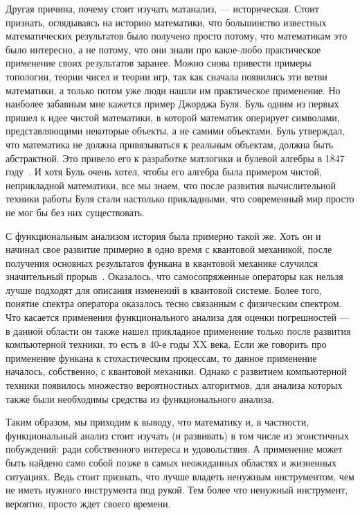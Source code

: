 \documentclass[russian]{article}
\begin{document}
Другая причина, почему стоит изучать матанализ, --- историческая. Стоит признать, оглядываясь на историю математики, что большинство известных математических результатов было получено просто потому, что математикам это было интересно, а не потому, что они знали про какое-любо практическое применение своих результатов заранее. Можно снова привести примеры топологии, теории чисел и теории игр, так как сначала появились эти ветви математики, а только потом уже люди нашли им практическое применение. Но наиболее забавным мне кажется пример Джорджа Буля. Буль одним из первых пришел к идее чистой математики, в которой математик оперирует символами, представляющими некоторые объекты, а не самими объектами. Буль утверждал, что математика не должна привязываться к реальным объектам, должна быть абстрактной. Это привело его к разработке матлогики и булевой алгебры в 1847 году~\cite{boole}. И хотя Буль очень хотел, чтобы его алгебра была примером чистой, неприкладной математики, все мы знаем, что после развития вычислительной техники работы Буля стали настолько прикладными, что современный мир просто не мог бы без них существовать.

С функциональным анализом история была примерно такой же. Хоть он и начинал свое развитие примерно в одно время с квантовой механикой, после получения основных результатов функана в квантовой механике случился значительный прорыв~\cite{quantum}. Оказалось, что самосопряженные операторы как нельзя лучше подходят для описания изменений в квантовой системе. Более того, понятие спектра оператора оказалось тесно связанным с физическим спектром.
Что касается применения функционального анализа для оценки погрешностей --- в данной области он также нашел прикладное применение только после развития компьютерной техники, то есть в 40-е годы XX века. Если же говорить про применение функана к стохастическим процессам, то данное применение началось, собственно, с квантовой механики. Однако с развитием компьютерной техники появилось множество вероятностных алгоритмов, для анализа которых также были необходимы средства из функционального анализа.

Таким образом, мы приходим к выводу, что математику и, в частности, функциональный анализ стоит изучать (и развивать) в том числе из эгоистичных побуждений: ради собственного интереса и удовольствия. А применение может быть найдено само собой позже в самых неожиданных областях и жизненных ситуациях. Ведь стоит признать, что лучше владеть ненужным инструментом, чем не иметь нужного инструмента под рукой. Тем более что ненужный инструмент, вероятно, просто ждет своего времени.
\end{document}
